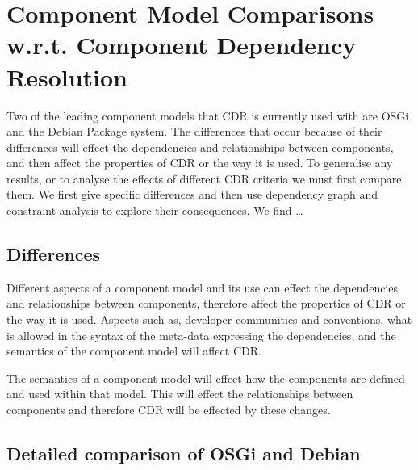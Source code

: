 \chapter{Component Model Comparisons w.r.t. Component Dependency Resolution}
\label{comparison}
{}Two of the leading component models that CDR is currently used with are OSGi and the Debian Package system.
{}The differences that occur because of their differences will effect the dependencies and relationships between components,
{}and then affect the properties of CDR or the way it is used.
{}To generalise any results, or to analyse the effects of different CDR criteria we must first compare them.
{}We first give specific differences and then use dependency graph and constraint analysis to explore their consequences.
{}We find \ldots%


\section{Differences}
{}Different aspects of a component model and its use can effect the dependencies and relationships between components,
{}therefore affect the properties of CDR or the way it is used.
{}Aspects such as, developer communities and conventions, what is allowed in the syntax of the meta-data expressing the dependencies,
{}and the semantics of the component model will affect CDR.  



	
	

The semantics of a component model will effect how the components are defined and used within that model.
This will effect the relationships between components and therefore CDR will be effected by these changes.

\section{Detailed comparison of OSGi and Debian}

